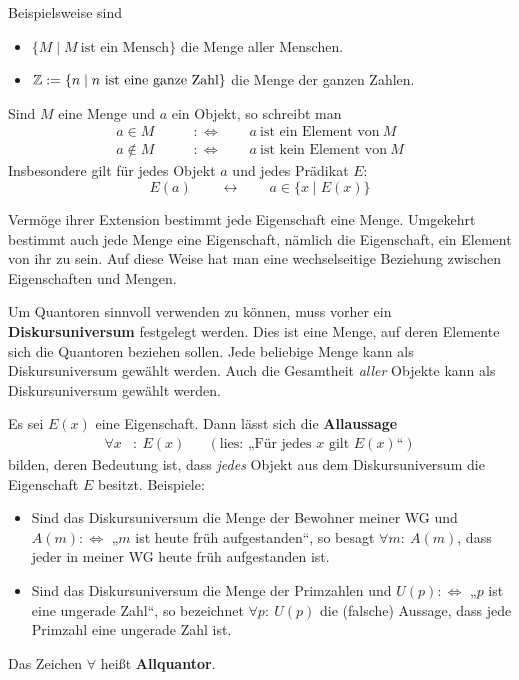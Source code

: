 \begin{bsp}
 Beispielsweise sind
 \begin{itemize}
  \item $\{M\mid M\ \text{ist ein Mensch}\}$ die Menge aller Menschen.
  \item ${\mathbb Z}:= \{n\mid n\ \text{ist eine ganze Zahl}\}$ die Menge der ganzen Zahlen.
 \end{itemize}
\end{bsp}


\begin{de}[Elementzeichen]
 Sind $M$ eine Menge und $a$ ein Objekt, so schreibt man
 \begin{align*}
  a\in M\qquad&:\Leftrightarrow\qquad a\ \text{ist ein Element von}\ M \\
    a\notin M\qquad&:\Leftrightarrow\qquad a\ \text{ist kein Element von}\ M
 \end{align*}
Insbesondere gilt für jedes Objekt $a$ und jedes Prädikat $E$:
\[ E(a) \qquad\leftrightarrow\qquad a\in \{x\mid E(x)\} \]
\end{de}

\begin{bem}
Vermöge ihrer Extension bestimmt jede Eigenschaft eine Menge. Umgekehrt bestimmt auch jede Menge eine Eigenschaft, nämlich die Eigenschaft, ein Element von ihr zu sein. Auf diese Weise hat man eine wechselseitige Beziehung zwischen Eigenschaften und Mengen.
\end{bem}




\begin{de}[Diskursuniversum]
 Um Quantoren sinnvoll verwenden zu können, muss vorher ein \textbf{Diskursuniversum} festgelegt werden. Dies ist eine Menge, auf deren Elemente sich die Quantoren beziehen sollen. Jede beliebige Menge kann als Diskursuniversum gewählt werden. Auch die Gesamtheit \emph{aller} Objekte kann als Diskursuniversum gewählt werden.
\end{de}



\begin{de}[Allaussage]
 Es sei $E(x)$ eine Eigenschaft. Dann lässt sich die \textbf{Allaussage}
 \begin{align*}
    \forall x&:\ E(x) && (\text{lies: „Für jedes $x$ gilt $E(x)$“})
 \end{align*}
bilden, deren Bedeutung ist, dass \emph{jedes} Objekt aus dem Diskursuniversum die Eigenschaft $E$ besitzt. Beispiele:
\begin{itemize}
 \item Sind das Diskursuniversum die Menge der Bewohner meiner WG und $A(m):\Leftrightarrow$ „$m$ ist heute früh aufgestanden“, so besagt $\forall m:\ A(m)$, dass jeder in meiner WG heute früh aufgestanden ist.
 \item Sind das Diskursuniversum die Menge der Primzahlen und $U(p):\Leftrightarrow$ „$p$ ist eine ungerade Zahl“, so bezeichnet $\forall p:\ U(p)$ die (falsche) Aussage, dass jede Primzahl eine ungerade Zahl ist.
\end{itemize}
Das Zeichen $\forall$ heißt \textbf{Allquantor}.
\end{de}


